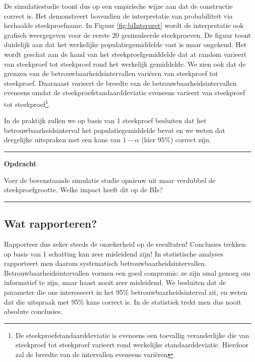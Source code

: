 \documentclass[
  12pt,dutch,coursenotes]{book}
\theoremstyle{definition}
\theoremstyle{definition}
\theoremstyle{definition}
\theoremstyle{remark}
\begin{document}
De simulatiestudie toont dus op een empirische wijze aan dat de constructie correct is.
Het demonstreert bovendien de interpretatie van probabiliteit via herhaalde steekproefname.
In Figuur \ref{fig:biInterpret} wordt de interpretatie ook grafisch weergegeven voor de eerste 20 gesimuleerde steekproeven. De figuur toont duidelijk aan dat het werkelijke populatiegemiddelde vast is maar ongekend. Het wordt geschat aan de hand van het steekproefgemiddelde dat at random varieert van steekproef tot steekproef rond het werkelijk gemiddelde.
We zien ook dat de grenzen van de betrouwbaarheidsintervallen variëren van steekproef tot steekproef.
Daarnaast varieert de breedte van de betrouwbaarheidsintervallen eveneens omdat de steekproefstandaarddeviatie eveneens varieert van steekproef tot steekproef\footnote{De steekproefstandaarddeviatie is eveneens een toevallig veranderlijke die van steekproef tot steekproef varieert rond werkelijke standaarddeviatie. Hierdoor zal de breedte van de intervallen eveneens variëren}.

In de praktijk zullen we op basis van 1 steekproef besluiten dat het betrouwbaarheidsinterval het populatiegemiddelde bevat en we weten dat dergelijke uitspraken met een kans van \(1-\alpha\) (hier 95\%) correct zijn.

\begin{center}\rule{0.5\linewidth}{0.5pt}\end{center}

\textbf{Opdracht}

Voer de bovenstaande simulatie studie opnieuw uit maar verdubbel de steekproefgrootte. Welke impact heeft dit op de BIs?

\begin{center}\rule{0.5\linewidth}{0.5pt}\end{center}

\hypertarget{wat-rapporteren}{%
\subsection{Wat rapporteren?}\label{wat-rapporteren}}

Rapporteer dus zeker steeds de onzekerheid op de resultaten! Conclusies trekken op basis van 1 schatting kan zeer misleidend zijn! In statistische analyses rapporteert men daarom systematisch betrouwbaarheidsintervallen.
Betrouwbaarheidsintervallen vormen een goed compromis: ze zijn smal genoeg om informatief te zijn, maar haast nooit zeer misleidend. We besluiten dat de parameter die ons interesseert in het 95\% betrouwbaarheidsinterval zit,
en weten dat die uitspraak met 95\% kans correct is.
In de statistiek trekt men dus nooit absolute conclusies.
\end{document}
